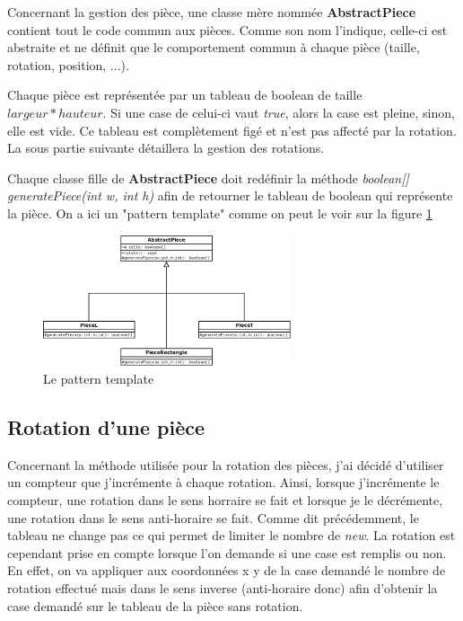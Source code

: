 \documentclass[report]{BetterDocument}
\begin{document}
			Concernant la gestion des pièce, une classe mère nommée \textbf{AbstractPiece} contient tout le code commun aux pièces. Comme son nom l'indique, celle-ci est abstraite et ne définit que le comportement commun à chaque pièce (taille, rotation, position, ...).

			Chaque pièce est représentée par un tableau de boolean de taille $largeur * hauteur$. Si une case de celui-ci vaut \textit{true}, alors la case est pleine, sinon, elle est vide. Ce tableau est complètement figé et n'est pas affecté par la rotation. La sous partie suivante détaillera la gestion des rotations.

			Chaque classe fille de \textbf{AbstractPiece} doit redéfinir la méthode \textit{boolean[] generatePiece(int w, int h)} afin de retourner le tableau de boolean qui représente la pièce. On a ici un "pattern template" comme on peut le voir sur la figure \ref{fig:pattern_template}

			\begin{figure}[H]
				\centering\includegraphics[width=0.65\textwidth, keepaspectratio]{img/pattern_template.png}
				\caption{Le pattern template}
				\label{fig:pattern_template}
			\end{figure}

		\subsection{Rotation d'une pièce}

			Concernant la méthode utilisée pour la rotation des pièces, j'ai décidé d'utiliser un compteur que j'incrémente à chaque rotation. Ainsi, lorsque j'incrémente le compteur, une rotation dans le sens horraire se fait et lorsque je le décrémente, une rotation dans le sens anti-horaire se fait. Comme dit précédemment, le tableau ne change pas ce qui permet de limiter le nombre de \textit{new}. La rotation est cependant prise en compte lorsque l'on demande si une case est remplis ou non. En effet, on va appliquer aux coordonnées x y de la case demandé le nombre de rotation effectué mais dans le sens inverse (anti-horaire donc) afin d'obtenir la case demandé sur le tableau de la pièce sans rotation.
\end{document}
